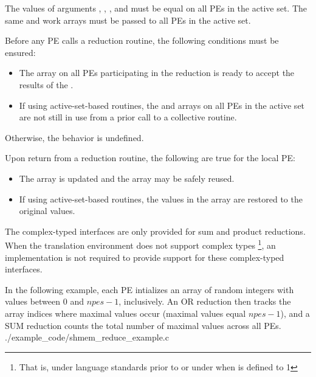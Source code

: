\begin{apidefinition}
{\begin{DeprecateBlock}
    The values of arguments , , ,
    and  must be equal on all \acp{PE} in the active set.
    The same  and  work arrays must be passed to all
    \acp{PE} in the active set.

    Before any \ac{PE} calls a reduction routine, the following conditions must be ensured:
    \begin{itemize}
    \item The \dest{} array on all \acp{PE} participating in the reduction
      is ready to accept the results of the .
    \item If using active-set-based routines, the
       and  arrays on all \acp{PE} in the
      active set are not still in use from a prior call to a collective
      \openshmem routine.
    \end{itemize}
    Otherwise, the behavior is undefined.
    
    Upon return from a reduction routine, the following are true for the local
    \ac{PE}:
    \begin{itemize}
    \item The \dest{} array is updated and the \source{} array may be safely reused.
    \item If using active-set-based routines,
    the values in the  array are restored to the original values.
    \end{itemize}
\end{DeprecateBlock}

    The complex-typed interfaces are only provided for sum and product reductions.
    When the \Cstd translation environment does not support complex types
    \footnote{That is, under \Cstd language standards prior to \Cstd[99] or under \Cstd[11]
    when  is defined to 1}, an \openshmem
    implementation is not required to provide support for these
    complex-typed interfaces.
}


\begin{apiexamples}

\apicexample
    {In the following \Cstd[11] example, each \ac{PE} intializes an array of
    random integers with values between $0$ and $npes-1$, inclusively.  An OR
    reduction then tracks the array indices where maximal values occur (maximal
    values equal $npes - 1$), and a SUM reduction counts the total number of
    maximal values across all PEs.
    }
    {./example_code/shmem_reduce_example.c}
    {}

\end{apiexamples}

\end{apidefinition}
